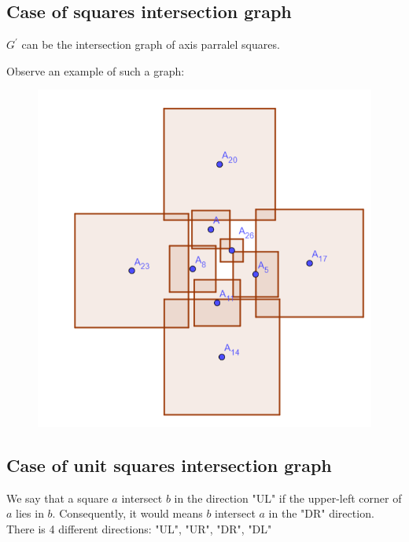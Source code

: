 \documentclass[12pt]{article}
\begin{document}
\newpage

\subsection{Case of squares intersection graph}
\begin{lemma}
    $G^'$ can be the intersection graph of axis parralel squares.
\end{lemma}
Observe an example of such a graph:
\begin{figure}[h]
    \centering
    \includegraphics[scale=0.4]{tex_images/8cube+_as_squares.png}        
\end{figure}



\subsection{Case of unit squares intersection graph}

\begin{definition}
    We say that a square $a$ intersect $b$ in the direction "UL" if the upper-left corner of $a$ lies in $b$. 
    Consequently, it would means $b$ intersect $a$ in the "DR" direction. There is 4 different directions: "UL", "UR", "DR", "DL"
\end{definition}
\end{document}
